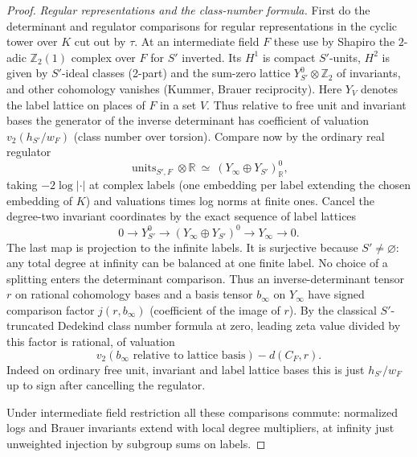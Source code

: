 \begin{proof}
\emph{Regular representations and the class-number formula.}  First do the
determinant and regulator comparisons for regular representations in the
cyclic tower over \(K\) cut out by \(\tau\). At an intermediate field \(F\)
these use by Shapiro the \(2\)-adic \(\mathbb Z_2(1)\) complex over \(F\) for
\(S'\) inverted. Its \(H^1\) is compact \(S'\)-units, \(H^2\) is given by
\(S'\)-ideal classes (2-part) and the sum-zero lattice
\(Y_{S'}^0\otimes\mathbb Z_2\) of invariants, and other cohomology vanishes
(Kummer, Brauer reciprocity). Here \(Y_V\) denotes the label lattice on places
of \(F\) in a set \(V\). Thus relative to free unit and invariant bases the
generator of the inverse determinant has coefficient of valuation
\(v_2(h_{S'}/w_F)\) (class number over torsion). Compare now by the ordinary
real regulator
\[
        \operatorname{units}_{S',F}\otimes\mathbb R
                    \ \simeq\ (Y_\infty\oplus Y_{S'})^0_{\mathbb R},
\]
taking \(-2\log|\cdot|\) at complex labels (one embedding per label extending
the chosen embedding of \(K\)) and valuations times log norms at finite ones.
Cancel the degree-two invariant coordinates by the exact sequence of
label lattices
\[
 0\longrightarrow Y_{S'}^0\longrightarrow
 (Y_\infty\oplus Y_{S'})^0\longrightarrow Y_\infty
 \longrightarrow0.
\]
The last map is projection to the infinite labels. It is surjective
because \(S'\ne\varnothing\): any total degree at infinity can be
balanced at one finite label. No choice of a splitting enters the
determinant comparison. Thus an
inverse-determinant tensor \(r\) on rational cohomology bases and a basis
tensor \(b_\infty\) on \(Y_\infty\) have signed comparison factor
\(j(r,b_\infty)\) (coefficient of the image of \(r\)). By the classical
\(S'\)-truncated Dedekind class number formula at zero, leading zeta value
divided by this factor is rational, of valuation
\[
                     v_2(b_\infty\text{ relative to lattice basis})
                                      -d(C_F,r).
\]
Indeed on ordinary free unit, invariant and label lattice bases this is just
\(h_{S'}/w_F\) up to sign after cancelling the regulator.

Under intermediate field restriction all these comparisons commute: normalized
logs and Brauer invariants extend with local degree multipliers, at infinity
just unweighted injection by subgroup sums on labels.


\end{proof}
